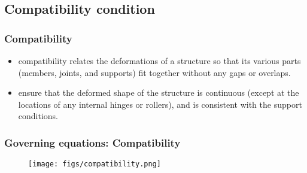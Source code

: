 \documentclass[handout]{beamer}
\begin{document}
\subsection{Compatibility condition}
\begin{frame}
	\frametitle{Compatibility}

		\begin{itemize}
			\item compatibility relates the deformations of a structure so that its
			various parts (members, joints, and supports) fit together without any gaps or
			overlaps. 
			\item ensure that the deformed shape of the structure is continuous (except at the 
			locations of any internal hinges or rollers), and is consistent with the support
			conditions.
		\end{itemize}
\end{frame}

\begin{frame}
\frametitle{Governing equations: Compatibility}
 	\begin{figure}
	\texttt{[image: figs/compatibility.png]}
\end{figure}
\end{frame}
\end{document}
